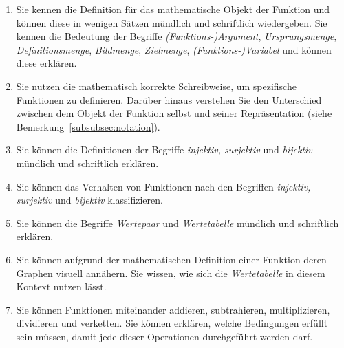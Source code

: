 \documentclass[12pt]{article}
\begin{document}
\begin{goals}\label{goals:funktionen_begrifflichkeit}
\footnotesize
\begin{enumerate}[label=\roman*)]
\item Sie kennen die Definition für das mathematische Objekt der Funktion und können diese in wenigen Sätzen mündlich und schriftlich wiedergeben. Sie kennen die Bedeutung der Begriffe \emph{(Funktions-)Argument}, \emph{Ursprungsmenge}, \emph{Definitionsmenge}, \emph{Bildmenge}, \emph{Zielmenge}, \emph{(Funktions-)Variabel} und können diese erklären.
\item Sie nutzen die mathematisch korrekte Schreibweise, um spezifische Funktionen zu definieren. Darüber hinaus verstehen Sie den Unterschied zwischen dem Objekt der Funktion selbst und seiner Repräsentation (siehe Bemerkung~\ref{subsubsec:notation}).
\item Sie können die Definitionen der Begriffe \emph{injektiv, surjektiv} und \emph{bijektiv} mündlich und schriftlich erklären.
\item Sie können das Verhalten von Funktionen nach den Begriffen \emph{injektiv, surjektiv} und \emph{bijektiv} klassifizieren.
\item Sie können die Begriffe \emph{Wertepaar} und \emph{Wertetabelle} mündlich und schriftlich erklären.
\item Sie können aufgrund der mathematischen Definition einer Funktion deren Graphen visuell annähern. Sie wissen, wie sich die \emph{Wertetabelle} in diesem Kontext nutzen lässt.
\item Sie können Funktionen miteinander addieren, subtrahieren, multiplizieren, dividieren und verketten. Sie können erklären, welche Bedingungen erfüllt sein müssen, damit jede dieser Operationen durchgeführt werden darf.
\end{enumerate}
\end{goals}

\newpage
\end{document}

